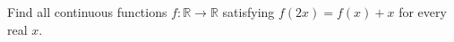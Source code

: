 Find all continuous functions $f:\mathbb R\to\mathbb R$ satisfying $f(2x)=f(x)+x$ for every real $x$.
